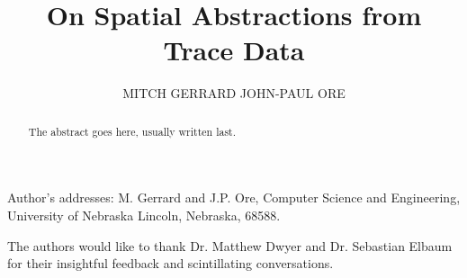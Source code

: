 \documentclass[prodmode,acmtecs]{acmsmall} %
\begin{document}

\title{On Spatial Abstractions from Trace Data}
\author{MITCH GERRARD
JOHN-PAUL ORE
}

\begin{abstract}
The abstract goes here, usually written last.
\end{abstract}




\begin{bottomstuff}


Author's addresses: M. Gerrard and J.P. Ore, Computer Science and Engineering,
University of Nebraska
Lincoln, Nebraska, 68588. 
\end{bottomstuff}

\maketitle













\begin{acks}
  The authors would like to thank Dr. Matthew Dwyer and Dr. Sebastian Elbaum for their insightful feedback and scintillating conversations.
\end{acks}




\end{document}
